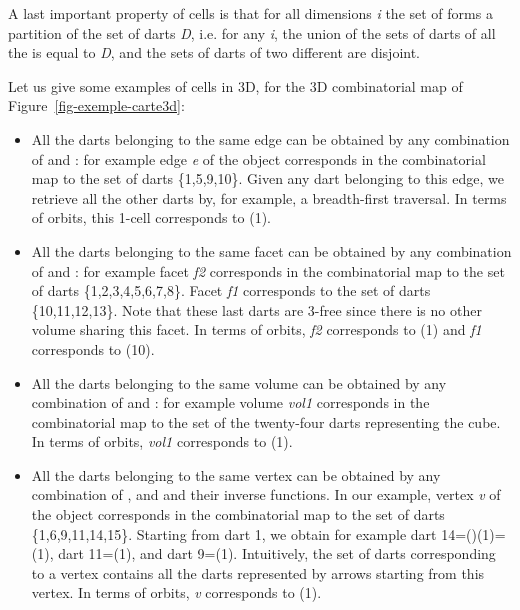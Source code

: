 A last important property of cells is that for all dimensions \emph{i} the
set of  forms a partition of the set of darts \emph{D}, i.e.  for
any \emph{i}, the union of the sets of darts of all the  is equal
to \emph{D}, and the sets of darts of two different  are disjoint.

Let us give some examples of cells in 3D, for the 3D combinatorial map
of Figure~\ref{fig-exemple-carte3d}:
\begin{itemize}
\item All the darts belonging to the same edge can be obtained by any
  combination of \betadeux{} and \betatrois{}: for example edge \emph{e} of the
  object corresponds in the combinatorial map to the set of darts
  \{1,5,9,10\}. Given any dart belonging to this edge, we retrieve
  all the other darts by, for example, a breadth-first traversal. In terms
  of orbits, this 1-cell corresponds to \orbit{\betadeux{},\betatrois{}}(1).

\item All the darts belonging to the same facet can be obtained by any
  combination of \betaun{} and \betatrois{}: for example facet \emph{f2}
  corresponds in the combinatorial map to the set of darts
  \{1,2,3,4,5,6,7,8\}. Facet \emph{f1} corresponds to the set of darts
  \{10,11,12,13\}. Note that these last darts are 3-free since
  there is no other volume sharing this facet.  In terms of orbits,
  \emph{f2} corresponds to \orbit{\betaun{},\betatrois{}}(1) and \emph{f1}
  corresponds to \orbit{\betaun{},\betatrois{}}(10).

\item All the darts belonging to the same volume can be obtained by
  any combination of \betaun{} and \betadeux{}: for example volume \emph{vol1}
  corresponds in the combinatorial map to the set of the twenty-four
  darts representing the cube. In terms of orbits, \emph{vol1} corresponds
  to \orbit{\betaun{},\betadeux{}}(1).

\item All the darts belonging to the same vertex can be obtained by
  any combination of \betaun{}\comp{}\betadeux{},
  \betaun{}\comp{}\betatrois{} and \betadeux{}\comp{}\betatrois{} and their inverse
  functions.  In our example, vertex \emph{v} of the object corresponds
  in the combinatorial map to the set of darts \{1,6,9,11,14,15\}.
  Starting from dart 1, we obtain for example dart
  14=(\betaun{}\comp{}\betadeux{})(1)=\betadeux{}\comp{}\betazero{}(1), dart
  11=\betaun{}\comp{}\betadeux{}(1), and dart 9=\betadeux{}\comp{}\betatrois{}(1).
  Intuitively, the set of darts corresponding to a vertex contains all
  the darts represented by arrows starting from this vertex.  In terms
  of orbits, \emph{v} corresponds to \orbit{\betaun{}\comp{}\betadeux{},
    \betaun{}\comp{}\betatrois{}, \betadeux{}\comp{}\betatrois{}}(1).
\end{itemize}

